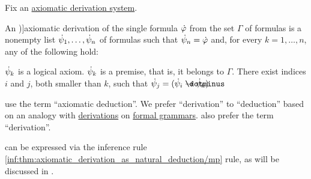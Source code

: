 \begin{definition}\label{def:axiomatic_derivation}
  Fix an \hyperref[def:axiomatic_derivation_system]{axiomatic derivation system}.

  An \term[ru=вывод (\cite[35]{Герасимов2011Вычислимость})]{axiomatic derivation} of the single formula \( \dot{\varphi} \) from the set \( \Gamma \) of formulas is a nonempty list \( \dot{\psi}_1, \ldots, \dot{\psi}_n \) of formulas such that \( \dot{\psi}_n = \dot{\varphi} \) and, for every \( k = 1, \ldots, n \), any of the following hold:
  \begin{thmenum}
     \( \dot{\psi}_k \) is a logical axiom.
     \( \dot{\psi}_k \) is a premise, that is, it belongs to \( \Gamma \).
     There exist indices \( i \) and \( j \), both smaller than \( k \), such that \( \syn\psi_j = (\syn\psi_i \synimplies \syn\psi_k) \).
  \end{thmenum}
\end{definition}
\begin{comments}
  \item {} use the term \enquote{axiomatic deduction}. We prefer \enquote{derivation} to \enquote{deduction} based on an analogy with \hyperref[def:formal_grammar/derivation]{derivations} on \hyperref[def:formal_grammar]{formal grammars}.  also prefer the term \enquote{derivation}.
  \item {} can be expressed via the inference rule \ref{inf:thm:axiomatic_derivation_as_natural_deduction/mp} rule, as will be discussed in .
\end{comments}

